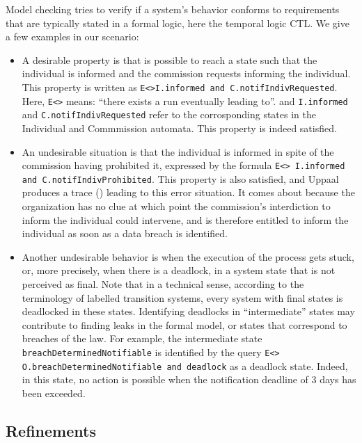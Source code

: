 Model checking tries to verify if a system's behavior conforms to requirements
that are typically stated in a formal logic, here the temporal logic CTL. We
give a few  examples in our scenario:

\begin{itemize}
\item A desirable property is that is possible to reach a state such that the
  individual is informed and the commission requests informing the
  individual. This property is written as \texttt{E<>I.informed and
    C.notifIndivRequested}. Here, \texttt{E<>} means: ``there exists a run
  eventually leading to''. and \texttt{I.informed} and
  \texttt{C.notifIndivRequested} refer to the corrosponding states in the
  Individual and Commmission automata. This property is indeed satisfied.

  
\item An undesirable situation is that the individual is informed in spite of
  the commission having prohibited it, expressed by the formula \texttt{E<>
    I.informed and C.notifIndivProhibited}. This property is also satisfied,
  and Uppaal produces a trace () leading to this error
  situation. It comes about because the organization has no clue at which
  point the commission's interdiction to inform the individual could
  intervene, and is therefore entitled to inform the individual as soon as a
  data breach is identified.

\item Another undesirable behavior is when the execution of the process gets
  stuck, or, more precisely, when there is a deadlock, in a system state that
  is not perceived as final. Note that in a technical sense, according to the
  terminology of labelled transition systems, every system with final states
  is deadlocked in these states. Identifying deadlocks in ``intermediate''
  states may contribute to finding leaks in the formal model, or states that
  correspond to breaches of the law. For example, the intermediate state
  \texttt{breachDeterminedNotifiable} is identified by the query \texttt{E<>
    O.breachDeterminedNotifiable and deadlock} as a deadlock state. Indeed, in
  this state, no action is possible when the notification deadline of 3 days
  has been exceeded.
\end{itemize}

\subsection{Refinements}\label{sec:refinements}



